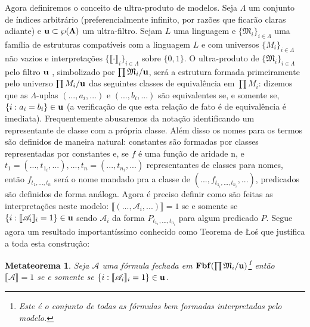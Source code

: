 \documentclass[12pt,a4paper]{article}
\newtheorem{mthrm}[mydef]{Metateorema}
\theoremstyle{definition}
\begin{document}
Agora definiremos o conceito de ultra-produto de modelos. Seja $\Lambda$ um conjunto de índices arbitrário (preferencialmente infinito, por razões que ficarão claras adiante) e $\bf{u}\subset \wp(\Lambda)$ um ultra-filtro. Sejam $L$ uma linguagem e $\{ \mathfrak{M}_i\}_{i\in \Lambda} $ uma família de estruturas compatíveis com a linguagem $L$ e com universos $\{ M_i\}_{i\in \Lambda} $ não vazios e interpretações $\{ \llbracket \cdot \rrbracket_i \}_{i\in \Lambda} $ sobre $\{0,1\}$. O ultra-produto de $\{ \mathfrak{M}_i\}_{i\in \Lambda} $ pelo filtro $\bf{u}$ , simbolizado por $\prod\mathfrak{M}_i /\bf{u} $, será a estrutura formada primeiramente pelo universo $\prod M_i /\bf{u} $ das seguintes classes de equivalência em $\prod M_i $: dizemos que as $\Lambda$-uplas $(..., a_i , ...)$ e $(..., b_i , ...)$ são equivalentes se, e somente se, $\{i:a_i = b_i \}\in \bf{u}$ (a verificação de que esta relação de fato é de equivalência é imediata). Frequentemente abusaremos da notação identificando um representante de classe com a própria classe. Além disso os nomes para os termos são definidos de maneira natural: constantes são formadas por classes representadas por constantes e, se $f$ é uma função de aridade n, e $t_1=(..., t_{1_i},...),...,t_n=(..., t_{n_i},...)$ representantes de classes para nomes, então $f_{t_1,...,t_n}$ será o nome mandado pra a classe de $(...,f_{t_{1_i},...,t_{n_i}},...)$, predicados são definidos de forma análoga. Agora é preciso definir como são feitas as interpretações neste modelo: $ \llbracket (... ,\mathscr{A}_i,...) \rrbracket=1$ se e somente se $\{i: \llbracket \mathscr{A}_i \rrbracket_i=1\}\in \bf{u}$ sendo $\mathscr{A}_i$ da forma $P_{t_{1_1},...,t_{n_i}}$ para algum predicado $P$.  Segue agora um resultado importantíssimo conhecido como Teorema de Łoś que justifica a toda esta construção:

\begin{mthrm}
	
	Seja $\mathscr{A}$ uma fórmula fechada em $\textrm{\textbf{Fbf}}(\prod \mathfrak{M}_i/\bf{u})$\footnote{Este é o conjunto de todas as fórmulas bem formadas interpretadas pelo modelo.} então $ \llbracket \mathscr{A} \rrbracket=1$ se e somente se $\{i: \llbracket \mathscr{A}_i \rrbracket_i=1\}\in \bf{u}$.
	
\end{mthrm}
\end{document}
